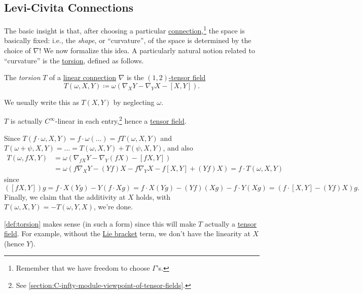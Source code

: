 \subsection{Levi-Civita Connections}
The basic insight is that, after choosing a particular \hyperref[def:linear-connection]{connection},\footnote{Remember that we have freedom to choose \(\Gamma \)'s.} the space is basically fixed: i.e., the \emph{shape}, or ``curvature'', of the space is determined by the choice of \(\nabla \)! We now formalize this idea. A particularly natural notion related to ``curvature'' is the \hyperref[def:torsion]{torsion}, defined as follows.

\begin{definition}[Torsion]\label{def:torsion}
	The \emph{torsion} \(T\) of a \hyperref[def:linear-connection]{linear connection} \(\nabla \) is the \hyperref[def:tensor]{\((1, 2)\)-tensor field}
	\[
		T(\omega , X, Y) \coloneqq \omega \left( \nabla _X Y - \nabla _Y X - [X, Y] \right) .
	\]
\end{definition}

\begin{notation}
	We usually write this as \(T(X, Y)\) by neglecting \(\omega \).
\end{notation}

\begin{remark}
	\(T\) is actually \(C^{\infty} \)-linear in each entry,\footnote{See \autoref{section:C-infty-module-viewpoint-of-tensor-fields}.} hence a \hyperref[def:tensor-field]{tensor field}.
\end{remark}
\begin{explanation}
	Since \(T(f\cdot \omega , X, Y) = f\cdot \omega \left( \dots \right) = f T(\omega , X, Y)\) and \(T(\omega + \psi , X, Y) = \dots = T(\omega , X, Y) + T(\psi , X, Y)\), and also
	\[
		\begin{split}
			T(\omega , fX, Y) & = \omega \left( \nabla _{fX} Y - \nabla _Y(fX) - [fX, Y] \right)    \\
			                  & = \omega (f \nabla _X Y - (Yf) X - f \nabla _Y X - f[X, Y] + (Yf)X)
			= f\cdot T(\omega , X, Y)
		\end{split}
	\]
	since
	\[
		([fX, Y])g = f\cdot X(Y g) - Y(f\cdot Xg)
		= f\cdot X(Yg) - (Yf) (Xg) - f\cdot Y(Xg)
		= \left( f\cdot [X, Y] - (Yf)X \right) g.
	\]
	Finally, we claim that the additivity at \(X\) holds, with \(T(\omega , X, Y) = -T(\omega , Y, X)\), we're done.
\end{explanation}

\begin{intuition}
	\autoref{def:torsion} makes sense (in such a form) since this will make \(T\) actually a \hyperref[def:tensor-field]{tensor field}. For example, without the \hyperref[def:bracket]{Lie bracket} term, we don't have the linearity at \(X\) (hence \(Y\)).
\end{intuition}

